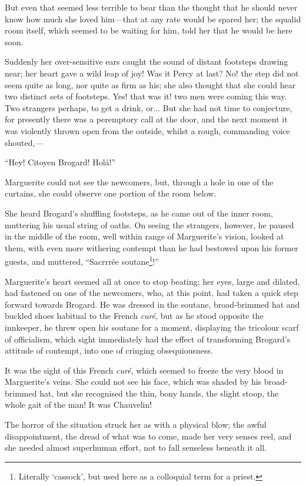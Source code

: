 \documentclass[paper=a5,BCOR=7mm,twoside,DIV=calc,12pt,usegeometry,chapterprefix,endperiod,headings=big]{scrbook}
\begin{document}
But even that seemed less terrible to bear than the thought that he should never know how much she loved him---that at any rate would be spared her; the squalid room itself, which seemed to be waiting for him, told her that he would be here soon.

Suddenly her over-sensitive ears caught the sound of distant footsteps drawing near; her heart gave a wild leap of joy! Was it Percy at last? No! the step did not seem quite as long, nor quite as firm as his; she also thought that she could hear two distinct sets of footsteps. Yes! that was it! two men were coming this way. Two strangers perhaps, to get a drink, or... But she had not time to conjecture, for presently there was a peremptory call at the door, and the next moment it was violently thrown open from the outside, whilst a rough, commanding voice shouted,---

\enquote{Hey! Citoyen Brogard! Holá!}

Marguerite could not see the newcomers, but, through a hole in one of the curtains, she could observe one portion of the room below.

She heard Brogard's shuffling footsteps, as he came out of the inner room, muttering his usual string of oaths. On seeing the strangers, however, he paused in the middle of the room, well within range of Marguerite's vision, looked at them, with even more withering contempt than he had bestowed upon his former guests, and muttered, \enquote{Sacrrrée soutane\footnote{Literally \enquote{cassock}, but used here as a colloquial term for a priest.}!}

Marguerite's heart seemed all at once to stop beating; her eyes, large and dilated, had fastened on one of the newcomers, who, at this point, had taken a quick step forward towards Brogard. He was dressed in the soutane, broad-brimmed hat and buckled shoes habitual to the French \textit{curé}, but as he stood opposite the innkeeper, he threw open his soutane for a moment, displaying the tricolour scarf of officialism, which sight immediately had the effect of transforming Brogard's attitude of contempt, into one of cringing obsequiousness.

It was the sight of this French \textit{curé}, which seemed to freeze the very blood in Marguerite's veins. She could not see his face, which was shaded by his broad-brimmed hat, but she recognised the thin, bony hands, the slight stoop, the whole gait of the man! It was Chauvelin!

The horror of the situation struck her as with a physical blow; the awful disappointment, the dread of what was to come, made her very senses reel, and she needed almost superhuman effort, not to fall senseless beneath it all.
\end{document}
